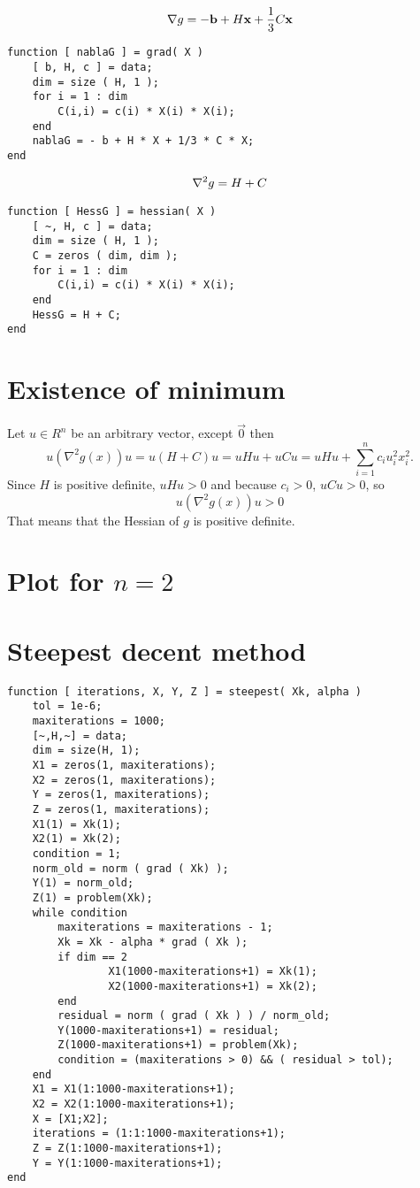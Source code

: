 \documentclass[a4paper,12pt]{article}
\begin{document}
\begin{align}\label{grad}
{\bf\nabla} g = -{\bf b} + H{\bf x} + \frac13C{\bf x}
\end{align}

\begin{lstlisting}
function [ nablaG ] = grad( X )
	[ b, H, c ] = data;
	dim = size ( H, 1 );
	for i = 1 : dim
	    C(i,i) = c(i) * X(i) * X(i);
	end
	nablaG = - b + H * X + 1/3 * C * X;
end
\end{lstlisting}

\begin{align}\label{hess}
{\bf\nabla}^2 g =  H + C
\end{align}

\begin{lstlisting}
function [ HessG ] = hessian( X )
	[ ~, H, c ] = data;
	dim = size ( H, 1 );
	C = zeros ( dim, dim );
	for i = 1 : dim
		C(i,i) = c(i) * X(i) * X(i);
	end
	HessG = H + C;
end
\end{lstlisting}


\section{Existence of minimum}
Let $u\in R^n$ be an arbitrary vector, except $\vec{0}$ then
$$u(\nabla^2g(x))u = u (H+C) u = u H u + uCu = uHu + \sum_{i=1}^n c_iu_i^2x_i^2.$$
Since $H$ is positive definite, $uHu>0$ and because $c_i>0$, $uCu>0$, so 
$$u(\nabla^2g(x))u>0$$ 
That means that the Hessian of $g$ is positive definite.
\section{Plot for $n=2$}

\section{Steepest decent method}
% 
\begin{lstlisting}
function [ iterations, X, Y, Z ] = steepest( Xk, alpha )
	tol = 1e-6;
	maxiterations = 1000;
	[~,H,~] = data;
	dim = size(H, 1);
	X1 = zeros(1, maxiterations);
	X2 = zeros(1, maxiterations);
	Y = zeros(1, maxiterations);
	Z = zeros(1, maxiterations);
	X1(1) = Xk(1);
	X2(1) = Xk(2);
	condition = 1;
	norm_old = norm ( grad ( Xk) );
	Y(1) = norm_old;
	Z(1) = problem(Xk);
	while condition
		maxiterations = maxiterations - 1;
		Xk = Xk - alpha * grad ( Xk );
		if dim == 2
				X1(1000-maxiterations+1) = Xk(1);
				X2(1000-maxiterations+1) = Xk(2);
		end
		residual = norm ( grad ( Xk ) ) / norm_old;
		Y(1000-maxiterations+1) = residual;
		Z(1000-maxiterations+1) = problem(Xk);
		condition = (maxiterations > 0) && ( residual > tol);
	end
	X1 = X1(1:1000-maxiterations+1);
	X2 = X2(1:1000-maxiterations+1);
	X = [X1;X2];
	iterations = (1:1:1000-maxiterations+1);
	Z = Z(1:1000-maxiterations+1);
	Y = Y(1:1000-maxiterations+1);
end
\end{lstlisting}
\end{document}
